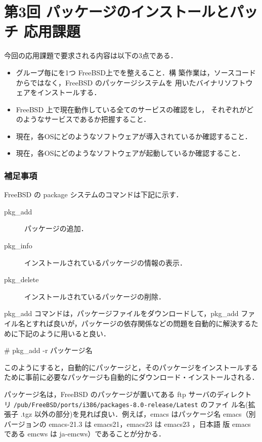 \section{第3回 パッケージのインストールとパッチ 応用課題}
今回の応用課題で要求される内容は以下の3点である．
\begin{itemize}
\item グループ毎に\textbf{}を1つ
      FreeBSD上で\textbf{}を整えること．構
      築作業は，ソースコードからではなく，FreeBSD のパッケージシステムを
      用いたバイナリソフトウェアをインストールする．
\item FreeBSD 上で現在動作している全てのサービスの確認をし，
  それぞれがどのようなサービスであるか把握すること．
\item 現在，各OSにどのようなソフトウェアが導入されているか確認すること．
\item 現在，各OSにどのようなソフトウェアが起動しているか確認すること．
\end{itemize}

\subsubsection*{補足事項}

FreeBSD の package システムのコマンドは下記に示す．
\begin{description}
 \item[pkg\_add] パッケージの追加．
 \item[pkg\_info] インストールされているパッケージの情報の表示．
 \item[pkg\_delete] インストールされているパッケージの削除．
\end{description}

pkg\_add コマンドは，パッケージファイルをダウンロードして，pkg\_add ファ
イル名とすれば良いが，パッケージの依存関係などの問題を自動的に解決するた
めに下記のように用いると良い．

\begin{cli}
# pkg_add -r パッケージ名
\end{cli}

このようにすると，自動的にパッケージと，そのパッケージをインストールする
ために事前に必要なパッケージも自動的にダウンロード・インストールされる．

パッケージ名は，FreeBSD のパッケージが置いてある ftp サーバのディレクト
リ \texttt{/pub/FreeBSD/ports/i386/packages-8.0-release/Latest} のファイ
ル名(拡張子 .tgz 以外の部分)を見れば良い．例えば，emacs はパッケージ名 
emacs（別バージョンの emacs-21.3 は emacs21，emacs23 は emacs23 ，日本語
版 emacs である emcws は ja-emcws）であることが分かる．

